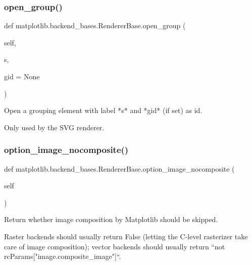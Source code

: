 \subsubsection{\texorpdfstring{open\+\_\+group()}{open\_group()}}
{\footnotesize\ttfamily def matplotlib.\+backend\+\_\+bases.\+Renderer\+Base.\+open\+\_\+group (\begin{DoxyParamCaption}\item[{}]{self,  }\item[{}]{s,  }\item[{}]{gid = {\ttfamily None} }\end{DoxyParamCaption})}

\begin{DoxyVerb}Open a grouping element with label *s* and *gid* (if set) as id.

Only used by the SVG renderer.
\end{DoxyVerb}
 \mbox{\label{classmatplotlib_1_1backend__bases_1_1RendererBase_abfc01341167f612af663bd02aec07e5a}} 
\subsubsection{\texorpdfstring{option\+\_\+image\+\_\+nocomposite()}{option\_image\_nocomposite()}}
{\footnotesize\ttfamily def matplotlib.\+backend\+\_\+bases.\+Renderer\+Base.\+option\+\_\+image\+\_\+nocomposite (\begin{DoxyParamCaption}\item[{}]{self }\end{DoxyParamCaption})}

\begin{DoxyVerb}Return whether image composition by Matplotlib should be skipped.

Raster backends should usually return False (letting the C-level
rasterizer take care of image composition); vector backends should
usually return ``not rcParams["image.composite_image"]``.
\end{DoxyVerb}
 \mbox{\label{classmatplotlib_1_1backend__bases_1_1RendererBase_a291ded5b0a681125bc27a87e746b9c21}} 
